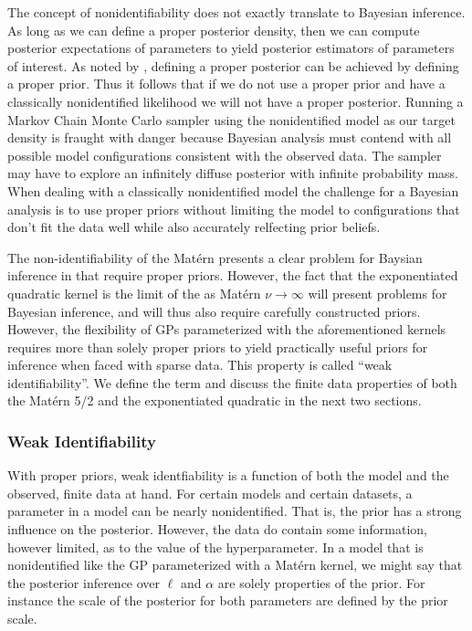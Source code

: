 \documentclass{article}
\begin{document}
The concept of nonidentifiability does not exactly translate to Bayesian
inference. As long as we can define a proper posterior density, then we can
compute posterior expectations of parameters to yield posterior estimators of
parameters of interest. As noted by \cite{xie2004note}, defining a proper
posterior can be achieved by defining a proper prior. Thus it follows that if
we do not use a proper prior and have a classically nonidentified likelihood we
will not have a proper posterior. Running a Markov Chain Monte Carlo sampler
using the nonidentified model as our target density is fraught with danger
because Bayesian analysis must contend with all possible model configurations
consistent with the observed data. The sampler may have to explore an
infinitely diffuse posterior with infinite probability mass. When dealing with
a classically nonidentified model the challenge for a Bayesian analysis is to
use proper priors without limiting the model to configurations that don't fit
the data well while also accurately relfecting prior beliefs.

The non-identifiability of the Mat\'{e}rn presents a clear problem for Baysian
inference in that require proper priors. However, the fact that the
exponentiated quadratic kernel is the limit of the as Mat\'{e}rn $\nu
\rightarrow \infty$ will present problems for Bayesian inference, and will thus
also require carefully constructed priors. However, the flexibility of GPs
parameterized with the aforementioned kernels requires more than solely proper
priors to yield practically useful priors for inference when faced with sparse
data. This property is called ``weak identifiability''. We define the term and
discuss the finite data properties of both the Mat\'{e}rn 5/2 and the
exponentiated quadratic in the next two sections.

\subsubsection{Weak Identifiability}

With proper priors, weak identfiability is a function of both the model and the
observed, finite data at hand. For certain models and certain datasets, a
parameter in a model can be nearly nonidentified. That is, the prior has a
strong influence on the posterior. However, the data do contain some
information, however limited, as to the value of the hyperparameter. 
In a model that is nonidentified like the GP parameterized with a Mat\'{e}rn
kernel, we might say that the posterior inference over $\ell$ and $\alpha$ are
solely properties of the prior. For instance the scale of the posterior for
both parameters are defined by the prior scale.
\end{document}
